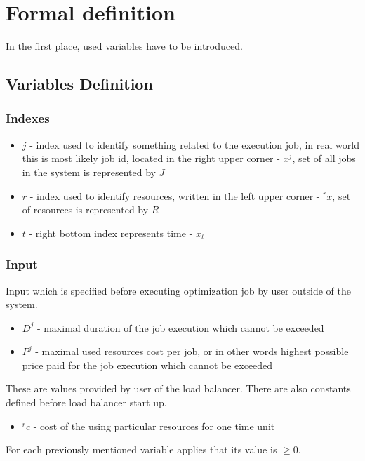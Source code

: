 
\section{Formal definition}\label{sec:formal-definition}
In the first place, used variables have to be introduced.

\subsection{Variables Definition}\label{subsec:variables-definition}

\subsubsection{Indexes}
\begin{itemize}
	\item $j$ - index used to identify something related to the execution job,
	      in real world this is most likely job id, located in the right upper corner - $x^{j}$, 
	      set of all jobs in the system is represented by $J$
	\item $r$ - index used to identify resources, written in the left upper corner - ${}^{r}x$, set of resources is represented by $R$
	\item $t$ - right bottom index represents time - $x_t$
\end{itemize}

\subsubsection{Input}
Input which is specified before executing optimization job by user outside of the system.

\begin{itemize}
	\item $D^{j}$ - maximal duration of the job execution which cannot be exceeded
	\item $P^{j}$ - maximal used resources cost per job, or in other words highest possible price paid for the job execution which cannot be exceeded
\end{itemize}
These are values provided by user of the load balancer.
There are also constants defined before load balancer start up.
\begin{itemize}
	\item ${}^{r}c$ - cost of the using particular resources for one time unit
\end{itemize}
For each previously mentioned variable applies that its value is $\geq 0$.


